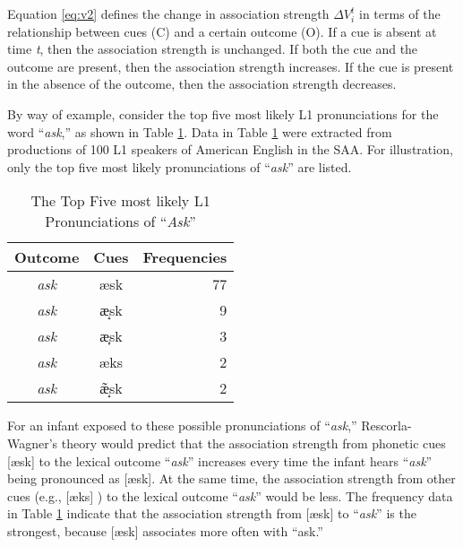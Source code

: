 Equation \ref{eq:v2} defines the change in association strength ${\Delta}{V_i^t}$ in terms of the relationship between cues (C) and a certain outcome (O). If a cue is absent at time \textit{t}, then the association strength is unchanged. If both the cue and the outcome are present, then the association strength increases. If the cue is present in the absence of the outcome, then the association strength decreases. 

By way of example, consider the top five most likely L1 pronunciations for the word “\textit{ask},” as shown in Table \ref{tab:top5}. Data in Table \ref{tab:top5} were extracted from productions of 100 L1 speakers of American English in the SAA. For illustration, only the top five most likely pronunciations of “\textit{ask}” are listed. 

\begin{table}[!h]
  \figSpace
  \centering
  \caption{The Top Five most likely L1 Pronunciations of “\textit{Ask}”}
    \begin{tabular}{ccr}
    \toprule
    Outcome & Cues  & Frequencies \\
    \midrule
    \textit{ask}  & æsk & 77 \\
    \textit{ask}  & æ̝sk  & 9 \\
    \textit{ask}  & æ̞sk & 3 \\
    \textit{ask}  & æks  & 2 \\
    \textit{ask}  & æ̝̃sk & 2\\
    \bottomrule
    \end{tabular}%
  \label{tab:top5}%
    \figSpace
\end{table}%

For an infant exposed to these possible pronunciations of “\textit{ask},” Rescorla-Wagner’s theory would predict that the association strength from phonetic cues [æsk] to the lexical outcome “\textit{ask}” increases every time the infant hears “\textit{ask}” being pronounced as [æsk]. At the same time, the association strength from other cues (e.g., [æks] ) to the lexical outcome “\textit{ask}” would be less. The frequency data in Table \ref{tab:top5} indicate that the association strength from  [æsk] to “\textit{ask}” is the strongest, because [æsk] associates more often with “ask.” 

